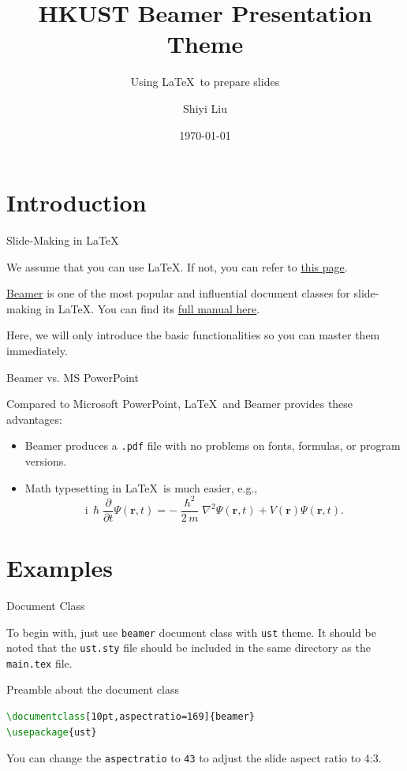 \documentclass[10pt,aspectratio=169]{beamer}
\title{HKUST Beamer Presentation Theme}
\subtitle{Using \LaTeX\ to prepare slides}
\author{Shiyi Liu}
\institute[ECE]{Department of Electronic and Computer Engineering}
\date{\today}
\begin{document}
\maketitle %

\section{Introduction}

\begin{frame}{Slide-Making in \LaTeX}

	We assume that you can use \LaTeX. If not, you can refer to \href{https://www.overleaf.com/learn/latex/Learn_LaTeX_in_30_minutes}{this page}.

	\href{https://www.overleaf.com/learn/latex/Beamer}{Beamer} is one of the most popular and influential document classes for slide-making in \LaTeX. You can find its \href{https://mirror-hk.koddos.net/CTAN/macros/latex/contrib/beamer/doc/beameruserguide.pdf}{full manual here}.

	Here, we will only introduce the basic functionalities so you can master them immediately.
\end{frame}


\begin{frame}{Beamer vs. MS PowerPoint}

	Compared to Microsoft PowerPoint, \LaTeX\ and Beamer provides these advantages:
	
	\begin{itemize}
		\item Beamer produces a \texttt{.pdf} file with no problems on fonts, formulas, or program versions.
		\item Math typesetting in \LaTeX\ is much easier, e.g.,
			\begin{equation*}
				\mathrm{i}\,\hslash\frac{\partial}{\partial t} \Psi(\mathbf{r},t) =
				-\frac{\hslash^2}{2\,m}\nabla^2\Psi(\mathbf{r},t)
				+ V(\mathbf{r})\Psi(\mathbf{r},t).
			\end{equation*}
	\end{itemize}
\end{frame}

\section{Examples}

\begin{frame}[fragile]{Document Class}

	To begin with, just use \texttt{beamer} document class with \texttt{ust} theme. It should be noted that the \texttt{ust.sty} file should be included in the same directory as the \texttt{main.tex} file.
	
\begin{block}{Preamble about the document class}
\begin{lstlisting}[language=TeX]
\documentclass[10pt,aspectratio=169]{beamer}
\usepackage{ust}
\end{lstlisting}
\end{block}
	
	You can change the \texttt{aspectratio} to \texttt{43} to adjust the slide aspect ratio to 4:3.
\end{frame}
\end{document}
